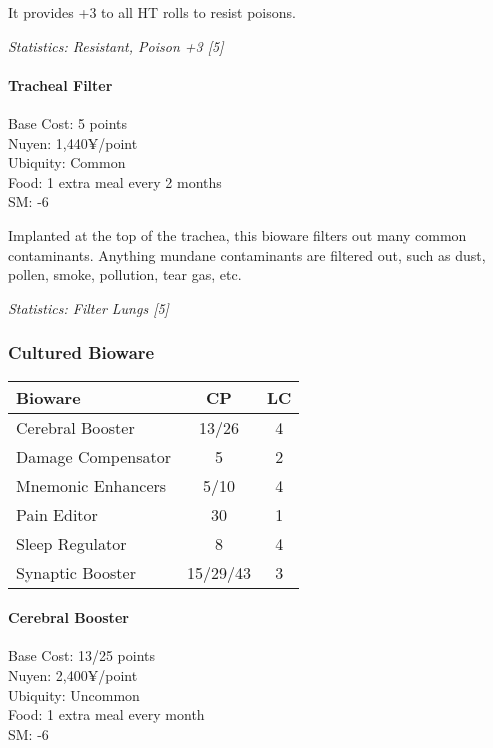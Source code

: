 \begin{multicols*}{3}
	It provides +3 to all HT rolls to resist poisons.
	
	\textit{\textcolor{OliveGreen}{Statistics: Resistant, Poison +3 [5]}}
	
	\paragraph{Tracheal Filter}
	\begin{flushright}
		Base Cost: 5 points\\
		Nuyen: 1,440¥/point\\
		Ubiquity: Common\\
		Food: 1 extra meal every 2 months\\
		SM: -6\\
	\end{flushright}
	
	Implanted at the top of the trachea, this bioware filters out many common contaminants. Anything mundane contaminants are filtered out, such as dust, pollen, smoke, pollution, tear gas, etc.
	
	\textit{\textcolor{OliveGreen}{Statistics: Filter Lungs [5]}}
	
	\subsubsection{Cultured Bioware}
	
	\begin{center}
		\begin{adjustwidth}{-4mm}{}
		\begin{tabularx}{0.35\textwidth}{|X|c|c|}
			\hline
			Bioware & CP & LC\\
			\hline
			\hline
			Cerebral Booster & 13/26 & 4 \\
			Damage Compensator & 5 & 2 \\
			Mnemonic Enhancers & 5/10 & 4 \\
			Pain Editor & 30 & 1 \\
			Sleep Regulator & 8 & 4 \\
			Synaptic Booster & 15/29/43 & 3 \\
			\hline
		\end{tabularx}
		\end{adjustwidth}
	\end{center}
	
	\paragraph{Cerebral Booster}
	\begin{flushright}
		Base Cost: 13/25 points\\
		Nuyen: 2,400¥/point\\
		Ubiquity: Uncommon\\
		Food: 1 extra meal every month\\
		SM: -6\\
	\end{flushright}
	

\end{multicols*}
